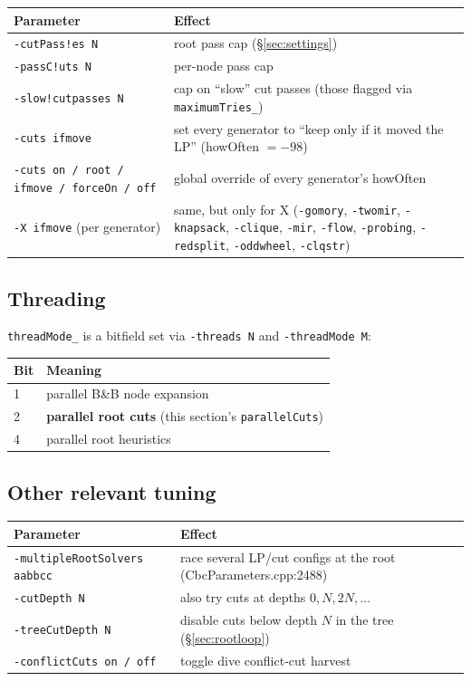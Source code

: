 \documentclass[11pt,a4paper]{article}
\begin{document}
\begin{tabular}{ll}
\toprule
Parameter & Effect\\
\midrule
\texttt{-cutPass!es N}      & root pass cap (\S\ref{sec:settings})\\
\texttt{-passC!uts N}       & per-node pass cap\\
\texttt{-slow!cutpasses N}  & cap on ``slow'' cut passes (those
                              flagged via \texttt{maximumTries\_})\\
\texttt{-cuts ifmove}       & set every generator to ``keep only if
                              it moved the LP'' (howOften $=-98$)\\
\texttt{-cuts on / root / ifmove / forceOn / off}
                            & global override of every generator's
                              howOften\\
\texttt{-X ifmove} (per generator)
                            & same, but only for X
                              (\texttt{-gomory}, \texttt{-twomir},
                              \texttt{-knapsack}, \texttt{-clique},
                              \texttt{-mir}, \texttt{-flow},
                              \texttt{-probing}, \texttt{-redsplit},
                              \texttt{-oddwheel}, \texttt{-clqstr})\\
\bottomrule
\end{tabular}

\subsection*{Threading}

\texttt{threadMode\_} is a bitfield set via \texttt{-threads N} and
\texttt{-threadMode M}:

\begin{tabular}{ll}
\toprule
Bit & Meaning\\
\midrule
1 & parallel B\&B node expansion\\
2 & \textbf{parallel root cuts} (this section's
    \texttt{parallelCuts})\\
4 & parallel root heuristics\\
\bottomrule
\end{tabular}

\subsection*{Other relevant tuning}

\begin{tabular}{ll}
\toprule
Parameter & Effect\\
\midrule
\texttt{-multipleRootSolvers aabbcc} & race several LP/cut configs at
                                       the root (CbcParameters.cpp:2488)\\
\texttt{-cutDepth N}        & also try cuts at depths $0,N,2N,\dots$\\
\texttt{-treeCutDepth N}    & disable cuts below depth $N$ in the
                              tree (\S\ref{sec:rootloop})\\
\texttt{-conflictCuts on / off} & toggle dive conflict-cut harvest\\
\bottomrule
\end{tabular}
\end{document}
